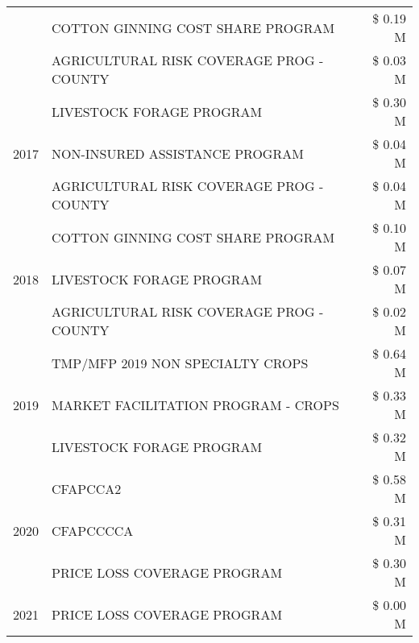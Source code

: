 \begin{tabular}{llr}
 & COTTON GINNING COST SHARE PROGRAM             & \$ 0.19 M \\
 & AGRICULTURAL RISK COVERAGE PROG - COUNTY      & \$ 0.03 M \\
\cline{1-3}
\multirow[t]{3}{*}{2017} & LIVESTOCK FORAGE PROGRAM & \$ 0.30 M \\
 & NON-INSURED ASSISTANCE PROGRAM & \$ 0.04 M \\
 & AGRICULTURAL RISK COVERAGE PROG - COUNTY & \$ 0.04 M \\
\cline{1-3}
\multirow[t]{3}{*}{2018} & COTTON GINNING COST SHARE PROGRAM & \$ 0.10 M \\
 & LIVESTOCK FORAGE PROGRAM & \$ 0.07 M \\
 & AGRICULTURAL RISK COVERAGE PROG - COUNTY & \$ 0.02 M \\
\cline{1-3}
\multirow[t]{3}{*}{2019} & TMP/MFP 2019 NON SPECIALTY CROPS & \$ 0.64 M \\
 & MARKET FACILITATION PROGRAM - CROPS & \$ 0.33 M \\
 & LIVESTOCK FORAGE PROGRAM & \$ 0.32 M \\
\cline{1-3}
\multirow[t]{3}{*}{2020} & CFAPCCA2 & \$ 0.58 M \\
 & CFAPCCCCA & \$ 0.31 M \\
 & PRICE LOSS COVERAGE PROGRAM & \$ 0.30 M \\
\cline{1-3}
2021 & PRICE LOSS COVERAGE PROGRAM & \$ 0.00 M \\
\cline{1-3}
\bottomrule
\end{tabular}
